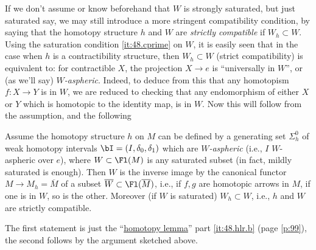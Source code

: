 If we don't assume or know beforehand that $W$ is strongly saturated,
but just saturated say, we may still introduce a more stringent
compatibility condition, by saying that the homotopy structure $h$ and
$W$ are \emph{strictly compatible} if $W_h\subset W$. Using the
saturation condition \ref{it:48.cprime} on $W$, it is easily seen that
in the case when $h$ is a contractibility structure, then $W_h\subset
W$ (strict compatibility) is equivalent to: for contractible $X$, the
projection $X\to e$ is ``universally in $W$'', or (as we'll say)
\emph{$W$-aspheric}. Indeed, to deduce from this that any homotopism
$f:X\to Y$ is in $W$, we are reduced to checking that any endomorphism
of either $X$ or $Y$ which is homotopic to the identity map, is in
$W$. Now this will follow from the assumption, and the following
\begin{proposition}\label{prop:54}
  Assume the homotopy structure $h$ on $M$ can be defined by a
  generating set $\Sigma_h^0$ of weak homotopy intervals
  $\bI=(I,\delta_0,\delta_1)$ which are \emph{$W$-aspheric} \textup(i.e., $I$
  $W$-aspheric over $e$\textup), where $W\subset\Fl(M)$ is any saturated
  subset \textup(in fact, mildly saturated is enough\textup). Then $W$ is the
  inverse image by the canonical functor $M\to M_h=\overline M$ of a
  subset $\overline W\subset\Fl(\overline M)$, i.e., if $f,g$ are
  homotopic arrows in $M$, if one is in $W$, so is the other. Moreover
  \textup(if $W$ is saturated\textup) $W_h\subset W$, i.e., $h$ and
  $W$ are strictly compatible.
\end{proposition}

The first statement is just the
``\hyperref[lem:hlr]{homotopy lemma}'' part \ref{it:48.hlr.b} (page
\ref{p:99}), the second follows by the argument sketched above.

